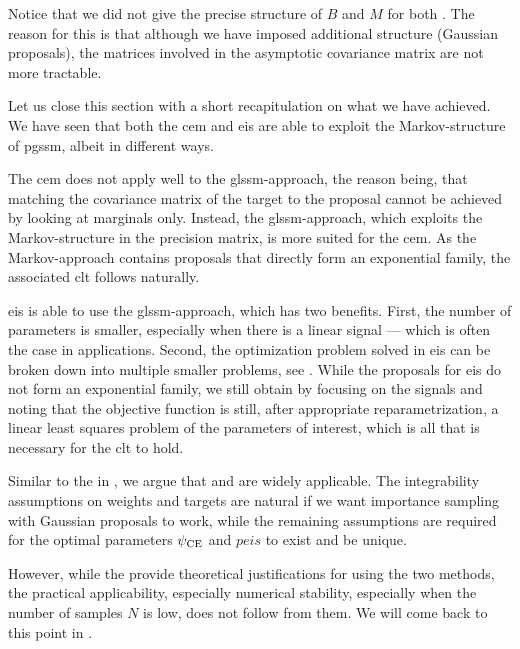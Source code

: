 Notice that we did not give the precise structure of $B$ and $M$ for both . The reason for this is that although we have imposed additional structure (Gaussian proposals), the matrices involved in the asymptotic covariance matrix are not more tractable. 

Let us close this section with a short recapitulation on what we have achieved. We have seen that both the \acrshort{cem} and \acrshort{eis} are able to exploit the Markov-structure of \acrshort{pgssm}, albeit in different ways. 

The \acrshort{cem} does not apply well to the \acrshort{glssm}-approach, the reason being, that matching the covariance matrix of the target to the proposal cannot be achieved by looking at marginals only. Instead, the \acrshort{glssm}-approach, which exploits the Markov-structure in the precision matrix, is more suited for the \acrshort{cem}. As the Markov-approach contains proposals that directly form an exponential family, the associated \acrshort{clt} follows naturally.

\acrshort{eis} is able to use the \acrshort{glssm}-approach, which has two benefits. First, the number of parameters is smaller, especially when there is a linear signal --- which is often the case in applications. Second, the optimization problem solved in \acrshort{eis} can be broken down into multiple smaller problems, see . While the proposals for \acrshort{eis} do not form an exponential family, we still obtain  by focusing on the signals and noting that the objective function is still, after appropriate reparametrization, a linear least squares problem of the parameters of interest, which is all that is necessary for the \acrshort{clt} to hold.

Similar to the  in , we argue that  and  are widely applicable. The integrability assumptions on weights and targets are natural if we want importance sampling with Gaussian proposals to work, while the remaining assumptions are required for the optimal parameters ${\psi_{\text{CE}}}$ and $peis$ to exist and be unique.

However, while the  provide theoretical justifications for using the two methods, the practical applicability, especially numerical stability, especially when the number of samples $N$ is low, does not follow from them. We will come back to this point in .